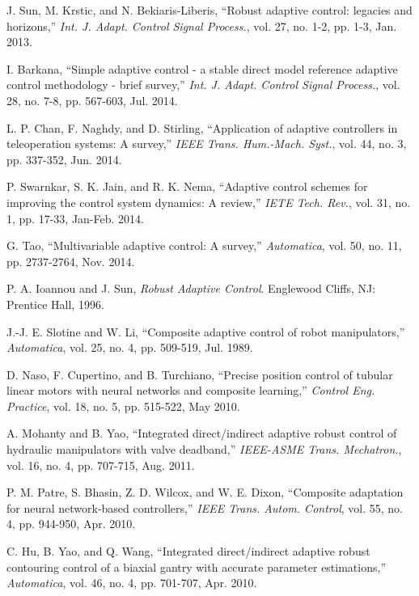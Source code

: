 \documentclass[conference]{IEEEtran}
\begin{document}
\begin{thebibliography}{99}
 J. Sun, M. Krstic, and N. Bekiaris-Liberis, ``Robust adaptive control: leg\-acies and horizons,'' \textit{Int. J. Adapt. Control Signal Process.}, vol. 27, no. 1-2, pp. 1-3, Jan. 2013.



 I. Barkana, ``Simple adaptive control - a stable direct model reference adaptive control methodology - brief survey,'' \textit{Int. J. Adapt. Control Signal Process.}, vol. 28, no. 7-8, pp. 567-603, Jul. 2014.

 L. P. Chan, F. Naghdy, and D. Stirling, ``Application of adaptive con\-trollers in teleoperation systems: A survey,'' \textit{IEEE Trans. Hum.-Mach. Syst.}, vol. 44, no. 3, pp. 337-352, Jun. 2014.


 P. Swarnkar, S. K. Jain, and R. K. Nema, ``Adaptive control schemes for improving the control system dynamics: A review,'' \textit{IETE Tech. Rev.}, vol. 31, no. 1, pp. 17-33, Jan-Feb. 2014.

 G. Tao, ``Multivariable adaptive control: A survey,'' \textit{Automatica}, vol. 50, no. 11, pp. 2737-2764, Nov. 2014.




 P. A. Ioannou and J. Sun, \textit{Robust Adaptive Control}. Englewood Cliffs, NJ: Prentice Hall, 1996.

 J.-J. E. Slotine and W. Li, ``Composite adaptive control of robot mani\-pulators,'' \textit{Automatica}, vol. 25, no. 4, pp. 509-519, Jul. 1989.


 D. Naso, F. Cupertino, and B. Turchiano, ``Precise position control of tubular linear motors with neural networks and composite learning,'' \textit{Control Eng. Practice}, vol. 18, no. 5, pp. 515-522, May 2010.

 A. Mohanty and B. Yao, ``Integrated direct/indirect adaptive robust control of hydraulic manipulators with valve deadband,'' \textit{IEEE-ASME Trans. Mechatron.}, vol. 16, no. 4, pp. 707-715, Aug. 2011.

 P. M. Patre, S. Bhasin, Z. D. Wilcox, and W. E. Dixon, ``Composite adaptation for neural network-based controllers,'' \textit{IEEE Trans. Autom. Control}, vol. 55, no. 4, pp. 944-950, Apr. 2010.

 C. Hu, B. Yao, and Q. Wang, ``Integrated direct/indirect adaptive ro\-bust contouring control of a biaxial gantry with accurate parameter es\-timations,'' \textit{Automatica}, vol. 46, no. 4, pp. 701-707, Apr. 2010.


\end{thebibliography}
\end{document}
